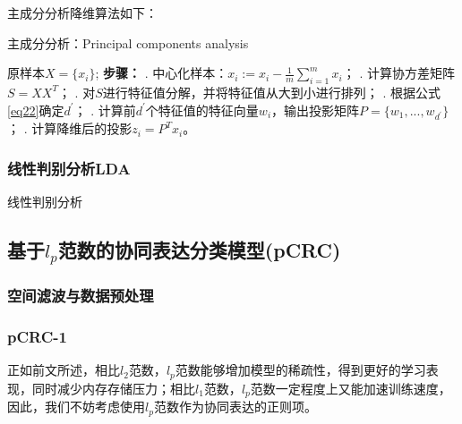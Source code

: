 \documentclass[12pt,a4paper]{article}
\begin{document}
主成分分析降维算法如下：
\begin{algorithm}[H] 
	\caption{主成分分析：Principal components analysis}  
	\label{alg:PCA}  
	\begin{algorithmic}
		\REQUIRE 
			原样本$X = \{x_{i}\}$;
		\STATE \textbf{步骤：}
		. 中心化样本：$x_{i} := x_{i} - \frac{1}{m}\sum_{i = 1}^{m}x_{i}$；   
		. 计算协方差矩阵$S = XX^{T}$；
		. 对$S$进行特征值分解，并将特征值从大到小进行排列；
		. 根据公式\eqref{eq22}确定$d^{'}$；
		. 计算前$d^{'}$个特征值的特征向量$w_{i}$，输出投影矩阵$P = \{w_{1}, ... , w_{d^{'}}\}$；
		. 计算降维后的投影$z_{i} = P^{T}x_{i}$。
	\end{algorithmic}  
\end{algorithm}  

\subsubsection{线性判别分析LDA}
线性判别分析

\subsection{基于$l_p$范数的协同表达分类模型(pCRC)}

\subsubsection{空间滤波与数据预处理}

\subsubsection{pCRC-1}
正如前文所述，相比$l_{2}$范数，$l_{p}$范数能够增加模型的稀疏性，得到更好的学习表现，同时减少内存存储压力；相比$l_{1}$范数，$l_{p}$范数一定程度上又能加速训练速度，因此，我们不妨考虑使用$l_{p}$范数作为协同表达的正则项。
\end{document}
